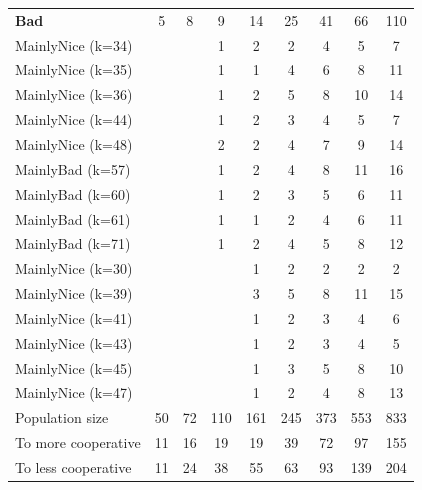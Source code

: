 \documentclass[journal,10pt,twoside]{IEEEtran}
\begin{document}
\begin{table}[ht]
\begin{minipage}{.55\textwidth}
\begin{tabular}{l|cccccccc}
        \textbf{Bad}        &   5 &   8 &    9 &   14 &   25 &   41 &   66 &  110 \\
        MainlyNice (k=34)   &     &     &    1 &    2 &    2 &    4 &    5 &    7 \\
        MainlyNice (k=35)   &     &     &    1 &    1 &    4 &    6 &    8 &   11 \\
        MainlyNice (k=36)   &     &     &    1 &    2 &    5 &    8 &   10 &   14 \\
        MainlyNice (k=44)   &     &     &    1 &    2 &    3 &    4 &    5 &    7 \\
        MainlyNice (k=48)   &     &     &    2 &    2 &    4 &    7 &    9 &   14 \\
        MainlyBad (k=57)    &     &     &    1 &    2 &    4 &    8 &   11 &   16 \\
        MainlyBad (k=60)    &     &     &    1 &    2 &    3 &    5 &    6 &   11 \\
        MainlyBad (k=61)    &     &     &    1 &    1 &    2 &    4 &    6 &   11 \\
        MainlyBad (k=71)    &     &     &    1 &    2 &    4 &    5 &    8 &   12 \\
        MainlyNice (k=30)   &     &     &      &    1 &    2 &    2 &    2 &    2 \\
        MainlyNice (k=39)   &     &     &      &    3 &    5 &    8 &   11 &   15 \\
        MainlyNice (k=41)   &     &     &      &    1 &    2 &    3 &    4 &    6 \\
        MainlyNice (k=43)   &     &     &      &    1 &    2 &    3 &    4 &    5 \\
        MainlyNice (k=45)   &     &     &      &    1 &    3 &    5 &    8 &   10 \\
        MainlyNice (k=47)   &     &     &      &    1 &    2 &    4 &    8 &   13 \\ \midrule
        Population size     &  50 &  72 &  110 &  161 &  245 &  373 &  553 &  833 \\
        To more cooperative &  11 &  16 &   19 &   19 &   39 &   72 &   97 &  155 \\
        To less cooperative &  11 &  24 &   38 &   55 &   63 &   93 &  139 &  204 \\ \bottomrule
    \end{tabular}
    \end{minipage} \quad
    \begin{minipage}{.35\textwidth}
    \begin{tabular}{l|ccccc} \toprule

\end{tabular}
\end{minipage}
\end{table}
\end{document}
